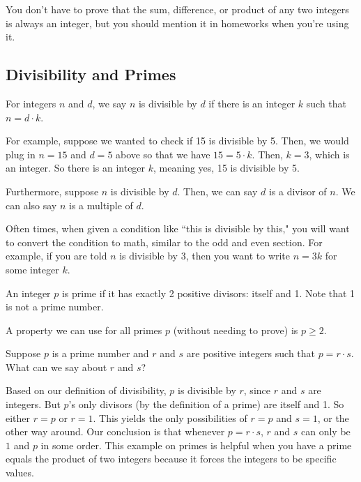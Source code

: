 \documentclass[11pt]{scrartcl}
\begin{document}
\begin{caveat}
You don't have to prove that the sum, difference, or product of any two integers is always an integer, but you should mention it in homeworks when you're using it.
\end{caveat}

\subsection{Divisibility and Primes}

\begin{definition}[Divisibility]
For integers $n$ and $d$, we say $n$ is divisible by $d$ if there is an integer $k$ such that $n = d \cdot k$.
\end{definition}
For example, suppose we wanted to check if 15 is divisible by 5. Then, we would plug in $n = 15$ and $d = 5$ above so that we have $15 = 5 \cdot k$. Then, $k = 3$, which is an integer. So there is an integer $k$, meaning yes, 15 is divisible by 5.

Furthermore, suppose $n$ is divisible by $d$. Then, we can say $d$ is a divisor of $n$. We can also say $n$ is a multiple of $d$.

\begin{advice}
Often times, when given a condition like ``this is divisible by this," you will want to convert the condition to math, similar to the odd and even section. For example, if you are told $n$ is divisible by 3, then you want to write $n = 3k$ for some integer $k$.
\end{advice}

\begin{definition}[Primes]
An integer $p$ is prime if it has exactly 2 positive divisors: itself and 1. Note that 1 is not a prime number.
\end{definition}
A property we can use for all primes $p$ (without needing to prove) is $p \geq 2$.

\begin{example}
    Suppose $p$ is a prime number and $r$ and $s$ are positive integers such that $p = r \cdot s$. What can we say about $r$ and $s$?
\end{example}
Based on our definition of divisibility, $p$ is divisible by $r$, since $r$ and $s$ are integers. But $p$'s only divisors (by the definition of a prime) are itself and 1. So either $r = p$ or $r = 1$. This yields the only possibilities of $r = p$ and $s = 1$, or the other way around. Our conclusion is that whenever $p = r \cdot s$, $r$ and $s$ can only be $1$ and $p$ in some order. This example on primes is helpful when you have a prime equals the product of two integers because it forces the integers to be specific values.
\end{document}
